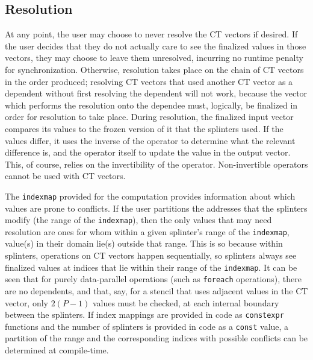 \subsection{Resolution}
At any point, the user may choose to never resolve the CT vectors if desired. If the 
user decides that they do not actually care to see the finalized values in those 
vectors, they may choose to leave them unresolved, incurring no runtime penalty for 
synchronization. Otherwise, resolution takes place on the chain of CT vectors in
the order produced; resolving CT vectors that used another CT vector as a dependent 
without first resolving the dependent will not work, because the vector which performs 
the resolution onto the dependee must, logically, be finalized in order for resolution 
to take place.
During resolution, the finalized input vector compares its values to the frozen
version of it that the splinters used. If the values differ, it uses the inverse
of the operator to determine what the relevant difference is, and the operator
itself to update the value in the output vector. This, of course, relies on the
invertibility of the operator. Non-invertible operators cannot be used with CT
vectors.

The \texttt{indexmap} provided for the computation provides information about
which values are prone to conflicts. If the user partitions the addresses that
the splinters modify (the range of the \texttt{indexmap}), then the only values
that may need resolution are ones for whom within a given splinter's range of
the \texttt{indexmap}, value(s) in their domain lie(s) outside that range. This
is so because within splinters, operations on CT vectors happen sequentially, so
splinters always see finalized values at indices that lie within their range of
the \texttt{indexmap}. It can be seen that for purely data-parallel operations
(such as \texttt{foreach} operations), there are no dependents, and that, say,
for a stencil that uses adjacent values in the CT vector, only $2(P-1)$ values
must be checked, at each internal boundary between the splinters. If index
mappings are provided in code as \texttt{constexpr} functions and the number of
splinters is provided in code as a \texttt{const} value, a partition of the
range and the corresponding indices with possible conflicts can be determined at
compile-time.
